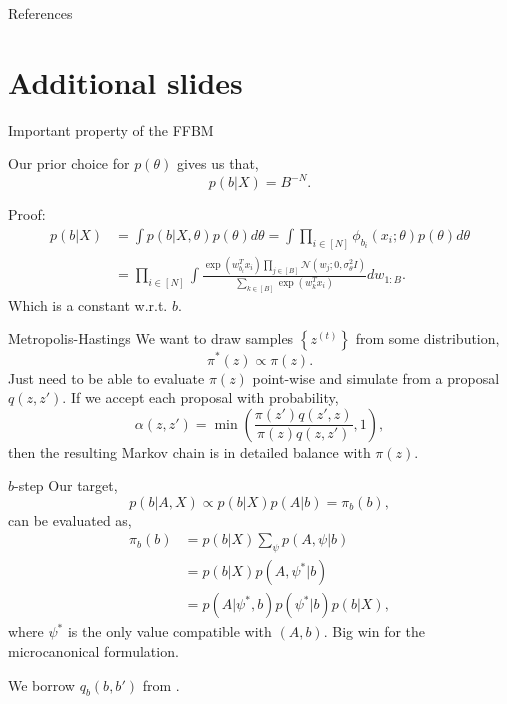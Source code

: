 \documentclass{beamer}
\newcommand{\Gaussian}{\mathcal{N}}
\begin{document}
	\begin{frame}{References}
		\tiny
		
	\end{frame}

\section*{Additional slides}

	\begin{frame}{Important property of the FFBM}
		\begin{theorem}
			Our prior choice for $p(\theta)$ gives us that,
			$$p(b|X) = B^{-N}.$$
		\end{theorem}
		
		Proof:
		\begin{align*}
			p(b | X) &= \int p(b | X, \theta) p(\theta) d\theta = \int \prod_{i \in [N] } \phi_{b_i}(x_i; \theta) p(\theta) d\theta \\
			&= \prod_{i \in [N]} \int \frac{\exp(w_{b_i}^T x_i) \prod_{j \in [B]} \Gaussian(w_j; 0, \sigma_\theta^2 I)}{\sum_{k \in [B]} \exp(w_{k}^T x_i)} dw_{1:B}.
		\end{align*}
		Which is a constant w.r.t. $b$.
	\end{frame}

	\begin{frame}{Metropolis-Hastings \cite{hastings-alg}}
		We want to draw samples $\left\{ z^{(t)} \right\}$ from some distribution,
		$$\pi^*(z) \propto \pi(z).$$
		Just need to be able to evaluate $\pi(z)$ point-wise and simulate from a proposal $q(z, z')$. If we accept each proposal with probability,
		$$\alpha(z, z') = \min \left( \frac{\pi(z') q(z', z)}{\pi(z) q(z, z')} , 1 \right),$$
		then the resulting Markov chain is in detailed balance with $\pi(z)$.
	\end{frame}
	
	\begin{frame}{$b$-step}
		Our target,
		$$p(b | A, X) \propto p(b | X) p(A | b) = \pi_b(b),$$
		can be evaluated as,
		\begin{align*}
			\pi_b(b) &= p(b|X) \sum_{\psi} p(A, \psi|b) \\
			&= p(b|X) p(A, \psi^* | b) \\
			&= p(A|\psi^*, b) p(\psi^*|b) p(b | X),
		\end{align*}
		where $\psi^*$ is the only value compatible with $(A,b)$. Big win for the microcanonical formulation.
		
		We borrow $q_b(b, b')$ from \citet{Peixoto-Bayesian-Microcanonical}.
	\end{frame}
	
\end{document}

